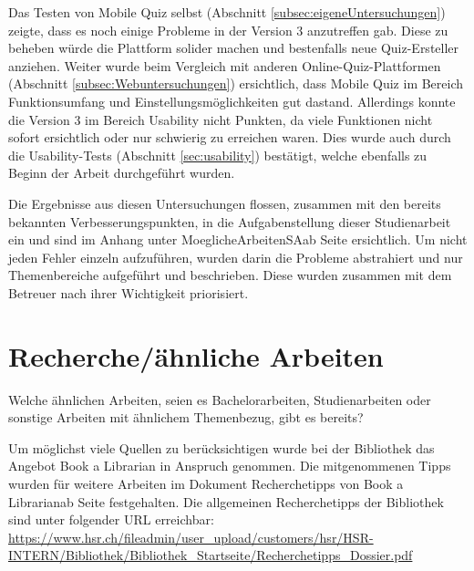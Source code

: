 \bigskip

Das Testen von Mobile Quiz selbst (Abschnitt \ref{subsec:eigeneUntersuchungen}) zeigte, dass es noch einige Probleme in der Version 3 anzutreffen gab. Diese zu beheben würde die Plattform solider machen und bestenfalls neue Quiz-Ersteller anziehen.
Weiter wurde beim Vergleich mit anderen Online-Quiz-Plattformen (Abschnitt \ref{subsec:Webuntersuchungen}) ersichtlich, dass Mobile Quiz im Bereich Funktionsumfang und Einstellungsmöglichkeiten gut dastand. Allerdings konnte die Version 3 im Bereich Usability nicht Punkten, da viele Funktionen nicht sofort ersichtlich oder nur schwierig zu erreichen waren. Dies wurde auch durch die Usability-Tests (Abschnitt \ref{sec:usability}) bestätigt, welche ebenfalls zu Beginn der Arbeit durchgeführt wurden.

\bigskip

Die Ergebnisse aus diesen Untersuchungen flossen, zusammen mit den bereits bekannten Verbesserungspunkten, in die Aufgabenstellung dieser Studienarbeit ein und sind im Anhang unter \glqq MoeglicheArbeitenSA\grqq ab Seite \hyperlink{page.\getpagerefnumber{pdf:moeglicheArbeiten}}{} ersichtlich. Um nicht jeden Fehler einzeln aufzuführen, wurden darin die Probleme abstrahiert und nur Themenbereiche aufgeführt und beschrieben. Diese wurden zusammen mit dem Betreuer nach ihrer Wichtigkeit priorisiert.

\newpage

\section{Recherche/ähnliche Arbeiten}
\label{sec:rechercheAehnlicheArbeiten}

Welche ähnlichen Arbeiten, seien es Bachelorarbeiten, Studienarbeiten oder sonstige Arbeiten mit ähnlichem Themenbezug, gibt es bereits?

\bigskip

Um möglichst viele Quellen zu berücksichtigen wurde bei der Bibliothek das Angebot \glqq Book a Librarian\grqq \cite{hsr_book_a_librarian} in Anspruch genommen. Die mitgenommenen Tipps wurden für weitere Arbeiten im Dokument \glqq Recherchetipps von Book a Librarian\grqq ab Seite \hyperlink{page.\getpagerefnumber{pdf:recherchetipps}}{} festgehalten. Die allgemeinen Recherchetipps der Bibliothek sind unter folgender URL erreichbar:\\ \url{https://www.hsr.ch/fileadmin/user_upload/customers/hsr/HSR-INTERN/Bibliothek/Bibliothek_Startseite/Recherchetipps_Dossier.pdf}

